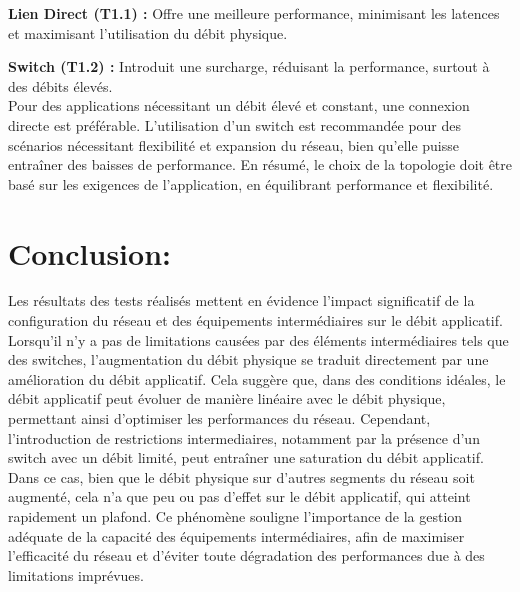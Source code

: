 \textbf{Lien Direct (T1.1) :} Offre une meilleure performance, minimisant les latences et maximisant l'utilisation du débit physique.

\textbf{Switch (T1.2) :} Introduit une surcharge, réduisant la performance, surtout à des débits élevés.\\

Pour des applications nécessitant un débit élevé et constant, une connexion directe est préférable. L'utilisation d'un switch est recommandée pour des scénarios nécessitant flexibilité et expansion du réseau, bien qu'elle puisse entraîner des baisses de performance. En résumé, le choix de la topologie doit être basé sur les exigences de l'application, en équilibrant performance et flexibilité.
\section {Conclusion: }
Les résultats des tests réalisés mettent en évidence l'impact significatif de la configuration du réseau et des équipements intermédiaires sur le débit applicatif. Lorsqu'il n'y a pas de limitations causées par des éléments intermédiaires tels que des switches, l'augmentation du débit physique se traduit directement par une amélioration du débit applicatif. Cela suggère que, dans des conditions idéales, le débit applicatif peut évoluer de manière linéaire avec le débit physique, permettant ainsi d’optimiser les performances du réseau. Cependant, l'introduction de restrictions intermediaires, notamment par la présence d'un switch avec un débit limité, peut entraîner une saturation du débit applicatif. Dans ce cas, bien que le débit physique sur d'autres segments du réseau soit augmenté, cela n’a que peu ou pas d'effet sur le débit applicatif, qui atteint rapidement un plafond. Ce phénomène souligne l'importance de la gestion adéquate de la capacité des équipements intermédiaires, afin de maximiser l'efficacité du réseau et d’éviter toute dégradation des performances due à des limitations imprévues.
